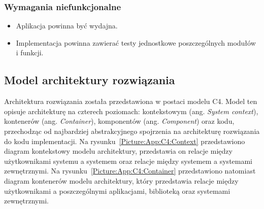         \subsubsection{Wymagania niefunkcjonalne}

            \begin{itemize}
                \item Aplikacja powinna być wydajna.
                \item Implementacja powinna zawierać testy jednostkowe poszczególnych modułów i funkcji.
            \end{itemize}

    \subsection{Model architektury rozwiązania}

        Architektura rozwiązania została przedstawiona w postaci modelu C4\cite{C4}. Model ten opisuje architekturę na czterech poziomach: kontekstowym (ang. \textit{System context}), kontenerów (ang. \textit{Container}), komponentów (ang. \textit{Component}) oraz kodu, przechodząc od najbardziej abstrakcyjnego spojrzenia na architekturę rozwiązania do kodu implementacji. Na rysunku~\ref{Picture:App:C4:Context} przedstawiono diagram kontekstowy modelu architektury, przedstawia on relacje między użytkownikami systemu a systemem oraz relacje między systemem a systemami zewnętrznymi. Na rysunku~\ref{Picture:App:C4:Container} przedstawiono natomiast diagram kontenerów modelu architektury, który przedstawia relacje między użytkownikami a poszczególnymi aplikacjami, biblioteką oraz systemami zewnętrznymi.

